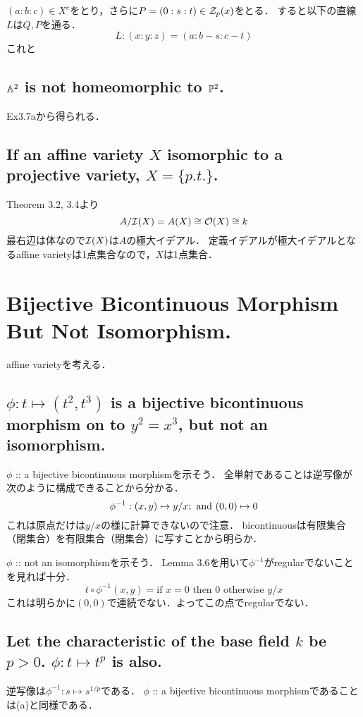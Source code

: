 \documentclass[a4paper]{jarticle}
\begin{document}
    $(a:b:c) \in X^c$をとり，さらに$P=(0:s:t) \in \mathcal{Z}_p(x)$をとる．
    すると以下の直線$L$は$Q,P$を通る．
    \[ L: (x:y:z)=(a:b-s:c-t) \]
    これと

    \subsection{$\mathbb{A}^2$ is not homeomorphic to $\mathbb{P}^2$.}
    Ex3.7aから得られる．

    \subsection{If an affine variety $X$ isomorphic to a projective variety, $X=\{p.t.\}$.}
    Theorem 3.2, 3.4より
    \[ A/\mathcal{I}(X)=A(X) \cong \mathcal{O}(X) \cong k \]
    最右辺は体なので$\mathcal{I}(X)$は$A$の極大イデアル．
    定義イデアルが極大イデアルとなるaffine varietyは1点集合なので，$X$は1点集合．

\section{Bijective Bicontinuous Morphism But Not Isomorphism.} %
    affine varietyを考える．
    \subsection{$\phi: t \mapsto (t^2,t^3)$ is a bijective bicontinuous morphism on to $y^2=x^3$, but not an isomorphism.}
    $\phi$ :: a bijective bicontinuous morphismを示そう．
    全単射であることは逆写像が次のように構成できることから分かる．
    \[ \phi^{-1}: (x,y) \mapsto y/x; \text{ and } (0,0) \mapsto 0 \]
    これは原点だけは$y/x$の様に計算できないので注意．
    bicontinuousは有限集合（閉集合）を有限集合（閉集合）に写すことから明らか．

    $\phi$ :: not an isomorphismを示そう．
    Lemma 3.6を用いて$\phi^{-1}$がregularでないことを見れば十分．
    \[ t \circ \phi^{-1}(x,y)=\mbox{if $x=0$ then $0$ otherwise $y/x$} \]
    これは明らかに$(0,0)$で連続でない．よってこの点でregularでない．

    \subsection{Let the characteristic of the base field $k$ be $p > 0$. $\phi: t \mapsto t^p$ is also.}
    逆写像は$\phi^{-1}: s \mapsto s^{1/p}$である．
    $\phi$ :: a bijective bicontinuous morphismであることは(a)と同様である．
\end{document}
